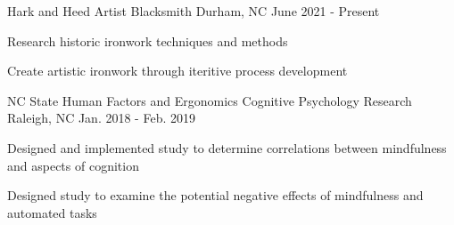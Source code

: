 

\begin{cventries}
  
  \cventry
    {Hark and Heed} %
    {Artist Blacksmith} %
    {Durham, NC} %
    {June 2021 - Present} %
    {
      \begin{cvitems} %
        \item {Research historic ironwork techniques and methods}
        \item {Create artistic ironwork through iteritive process development}
      \end{cvitems}
    }
  \cventry
    {NC State Human Factors and Ergonomics} %
    {Cognitive Psychology Research} %
    {Raleigh, NC} %
    {Jan. 2018 - Feb. 2019} %
    {
      \begin{cvitems} %
        \item {Designed and implemented study to determine correlations between mindfulness and aspects of cognition}
        \item {Designed study to examine the potential negative effects of mindfulness and automated tasks}
      \end{cvitems}
    }


\end{cventries}
